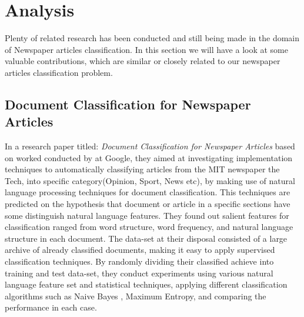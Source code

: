 \chapter{Analysis}
Plenty of related research has been conducted and still being made in the domain of Newspaper articles classification. In this section we will have a look at some valuable contributions, which are similar or closely related to our newspaper articles classification problem.  

\section{Document Classification for Newspaper Articles}
In a research paper titled: \textit{Document Classification for Newspaper Articles} based on worked conducted by \cite{Ramdass2009} at Google, they aimed at investigating implementation techniques to automatically classifying articles from the MIT newspaper the Tech, into specific category(Opinion, Sport, News etc), by making use of natural language processing techniques for document classification. This techniques are predicted on the hypothesis that document or article in a specific sections have some distinguish natural language features. They found out salient features for classification ranged from word structure, word frequency, and natural language structure in each document. The data-set at their disposal consisted of a large archive of  already classified documents, making it easy to apply supervised classification techniques.
By randomly dividing their classified achieve into training and test data-set, they conduct experiments using various natural language feature set and statistical techniques, applying different classification algorithms such as Naive Bayes , Maximum Entropy, and comparing the performance in each case.  

